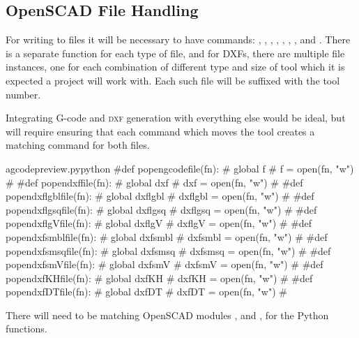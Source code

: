 \documentclass{ltxdoc}
\begin{document}
\begin{samepage}
\subsection{OpenSCAD File Handling}
 
For writing to files it will be necessary to have commands: 
, 
, 
, 
, 
, 
,  
, and 
.
There is a separate function for each type of file, and for DXFs, there are multiple file instances, one for each combination of different type and size of tool which it is expected a project will work with. Each such file will be suffixed with the tool number.

Integrating G-code and \textsc{dxf} generation with everything else would be ideal, but will require ensuring that each command which moves the tool creates a matching command for both files.

\lstset{firstnumber=\thegcpy}
\begin{writecode}{a}{gcodepreview.py}{python}
#def popengcodefile(fn):
#    global f
#    f = open(fn, "w")
#
#def popendxffile(fn):
#    global dxf
#    dxf = open(fn, "w")
#
#def popendxflgblfile(fn):
#    global dxflgbl
#    dxflgbl = open(fn, "w")
#
#def popendxflgsqfile(fn):
#    global dxflgsq
#    dxflgsq = open(fn, "w")
#
#def popendxflgVfile(fn):
#    global dxflgV
#    dxflgV = open(fn, "w")
#
#def popendxfsmblfile(fn):
#    global dxfsmbl
#    dxfsmbl = open(fn, "w")
#
#def popendxfsmsqfile(fn):
#    global dxfsmsq
#    dxfsmsq = open(fn, "w")
#
#def popendxfsmVfile(fn):
#    global dxfsmV
#    dxfsmV = open(fn, "w")
#
#def popendxfKHfile(fn):
#    global dxfKH
#    dxfKH = open(fn, "w")
#
#def popendxfDTfile(fn):
#    global dxfDT
#    dxfDT = open(fn, "w")
#
\end{writecode}
\addtocounter{gcpy}{40}
\end{samepage}

There will need to be matching OpenSCAD modules 
, and
, 
for the Python functions.
\end{document}
